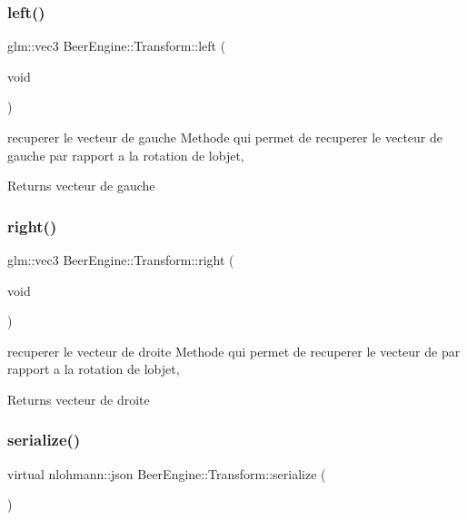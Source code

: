 \subsubsection{\texorpdfstring{left()}{left()}}
{\footnotesize\ttfamily glm\+::vec3 Beer\+Engine\+::\+Transform\+::left (\begin{DoxyParamCaption}\item[{void}]{ }\end{DoxyParamCaption})}



recuperer le vecteur de gauche Methode qui permet de recuperer le vecteur de gauche par rapport a la rotation de l\textquotesingle{}objet, 

\begin{DoxyReturn}{Returns}
vecteur de gauche 
\end{DoxyReturn}
\mbox{\label{class_beer_engine_1_1_transform_afcd8cfe1fcd321abcb0950127ee4f76d}} 
\subsubsection{\texorpdfstring{right()}{right()}}
{\footnotesize\ttfamily glm\+::vec3 Beer\+Engine\+::\+Transform\+::right (\begin{DoxyParamCaption}\item[{void}]{ }\end{DoxyParamCaption})}



recuperer le vecteur de droite Methode qui permet de recuperer le vecteur de par rapport a la rotation de l\textquotesingle{}objet, 

\begin{DoxyReturn}{Returns}
vecteur de droite 
\end{DoxyReturn}
\mbox{\label{class_beer_engine_1_1_transform_aafa05f7ad8f420d5aa35671fd1f65d37}} 
\subsubsection{\texorpdfstring{serialize()}{serialize()}}
{\footnotesize\ttfamily virtual nlohmann\+::json Beer\+Engine\+::\+Transform\+::serialize (\begin{DoxyParamCaption}{ }\end{DoxyParamCaption})\hspace{0.3cm}{\ttfamily [virtual]}}




